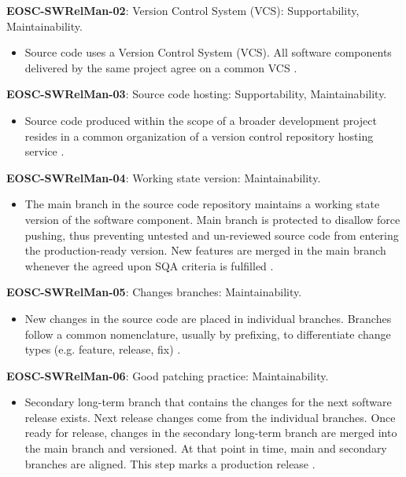 \textbf{EOSC-SWRelMan-02}: Version Control System (VCS): Supportability, Maintainability.

\begin{itemize}
    \item Source code uses a Version Control System (VCS). All software components delivered by the same project agree on a common VCS \cite{orviz_set_2017}.
\end{itemize}

\textbf{EOSC-SWRelMan-03}: Source code hosting: Supportability, Maintainability.

\begin{itemize}
    \item Source code produced within the scope of a broader development project resides in a common organization of a version control repository hosting service \cite{orviz_set_2017}.
\end{itemize}

\textbf{EOSC-SWRelMan-04}: Working state version: Maintainability.

\begin{itemize}
    \item The main branch in the source code repository maintains a working state version of the software component. Main branch is protected to disallow force pushing, thus preventing untested and un-reviewed source code from entering the production-ready version. New features are merged in the main branch whenever the agreed upon SQA criteria is fulfilled \cite{orviz_set_2017}.
\end{itemize}

\textbf{EOSC-SWRelMan-05}: Changes branches: Maintainability.

\begin{itemize}
    \item New changes in the source code are placed in individual branches. Branches follow a common nomenclature, usually by prefixing, to differentiate change types (e.g. feature, release, fix) \cite{orviz_set_2017}.
\end{itemize}

\textbf{EOSC-SWRelMan-06}: Good patching practice: Maintainability.

\begin{itemize}
    \item Secondary long-term branch that contains the changes for the next software release exists. Next release changes come from the individual branches. Once ready for release, changes in the secondary long-term branch are merged into the main branch and versioned. At that point in time, main and secondary branches are aligned. This step marks a production release \cite{orviz_set_2017,raymond_software_2013}.
\end{itemize}

